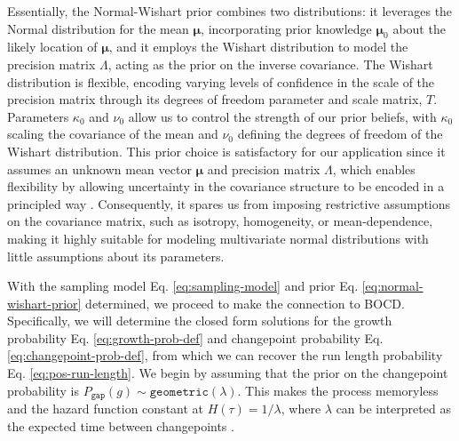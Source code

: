 \documentclass[Afour,sageh,times]{sagej}
\theoremstyle{lemma}
\begin{document}
Essentially, the Normal-Wishart prior combines two distributions: it leverages the Normal distribution for the mean $\boldsymbol{\mu}$, incorporating prior knowledge $\boldsymbol{\mu}_0$ about the likely location of $\boldsymbol{\mu}$, and it employs the Wishart distribution to model the precision matrix $\Lambda$, acting as the prior on the inverse covariance. The Wishart distribution is flexible, encoding varying levels of confidence in the scale of the precision matrix through its degrees of freedom parameter and scale matrix, $T$. Parameters $\kappa_0$ and $\nu_0$ allow us to control the strength of our prior beliefs, with $\kappa_0$ scaling the covariance of the mean and $\nu_0$ defining the degrees of freedom of the Wishart distribution. This prior choice is satisfactory for our application since it assumes an unknown mean vector $\boldsymbol{\mu}$ and precision matrix $\Lambda$, which enables flexibility by allowing uncertainty in the covariance structure to be encoded in a principled way \cite[]{degroot1970optimal, murphy2007conjugateforms}. Consequently, it spares us from imposing restrictive assumptions on the covariance matrix, such as isotropy, homogeneity, or mean-dependence, making it highly suitable for modeling multivariate normal distributions with little assumptions about its parameters.

With the sampling model Eq. \eqref{eq:sampling-model} and prior Eq. \eqref{eq:normal-wishart-prior} determined, we proceed to make the connection to BOCD. Specifically, we will determine the closed form solutions for the growth probability Eq. \eqref{eq:growth-prob-def} and changepoint probability Eq. \eqref{eq:changepoint-prob-def}, from which we can recover the run length probability Eq. \eqref{eq:pos-run-length}. We begin by assuming that the prior on the changepoint probability is $P_{\mathtt{gap}}(g) \sim \mathtt{geometric}(\lambda)$. This makes the process memoryless and the hazard function constant at $H(\tau) = 1 / \lambda$, where $\lambda$ can be interpreted as the expected time between changepoints \cite[]{adams2007bayesian}.
\end{document}
